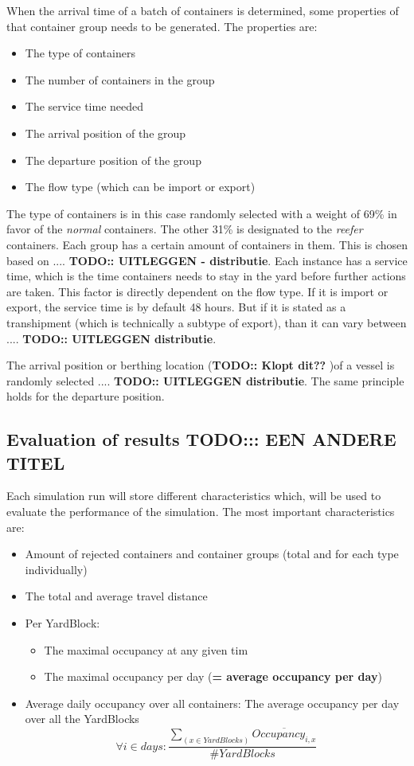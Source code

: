 \documentclass[]{article}
\begin{document}
When the arrival time of a batch of containers is determined, some properties
of that container group needs to be generated. The properties are: 
\begin{itemize}
      \item The type of containers
      \item The number of containers in the group
      \item The service time needed
      \item The arrival position of the group
      \item The departure position of the group
      \item The flow type (which can be import or export)
\end{itemize}

The type of containers is in this case randomly selected with a weight of 69\%
in favor of the \textit{normal} containers. The other 31\% is designated to the
\textit{reefer} containers. Each group has a certain amount of containers in
them. This is chosen based on .... \textbf{TODO:: UITLEGGEN - distributie}.
Each instance has a service time, which is the time containers needs to stay in
the yard before further actions are taken. This factor is directly dependent on
the flow type. If it is import or export, the service time is by default 48
hours. But if it is stated as a transhipment (which is technically a subtype of
export), than it can vary between .... \textbf{TODO:: UITLEGGEN \-
      distributie}.

The arrival position or berthing location (\textbf{TODO:: Klopt dit??} )of a
vessel is randomly selected .... \textbf{TODO:: UITLEGGEN \- distributie}. The
same principle holds for the departure position.

\subsection{Evaluation of results \Large TODO::: EEN ANDERE TITEL}
Each simulation run will store different characteristics which, will be used to
evaluate the performance of the simulation. The most important characteristics
are: \begin{itemize}
      \item Amount of rejected containers and container groups (total and for each type
            individually)
      \item The total and average travel distance
      \item Per YardBlock:
            \begin{itemize}
                  \item The maximal occupancy at any given tim
                  \item The maximal occupancy per day (\textbf{= average occupancy per day})
            \end{itemize}
      \item Average daily occupancy over all containers: The average occupancy per day over
            all the YardBlocks \[\forall i \in days: \frac{\sum_{(x \in YardBlocks)}
                        \overline{Occupancy_{i,x}}}{\#YardBlocks}\]
\end{itemize}
\end{document}
